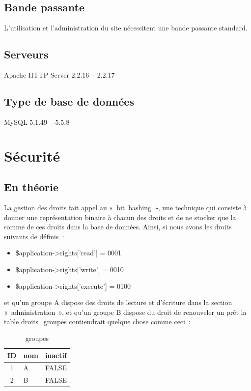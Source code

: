 \documentclass[letter, 11pt]{report}
\begin{document}
\subsection{Bande passante}
L'utilisation et l'administration du site nécessitent une bande passante standard.

\subsection{Serveurs}
Apache HTTP Server 2.2.16 -- 2.2.17

\subsection{Type de base de données}
MySQL 5.1.49 -- 5.5.8

\section{Sécurité}
\label{sec:sécurité}

\subsection{En théorie}

La gestion des droits fait appel au «~bit~bashing~», une technique qui consiste à donner une représentation binaire à chacun des droits et de ne stocker que la somme de ces droits dans la base de données. Ainsi, si nous avons les droits suivants de définis~:

\begin{itemize}
	\item \$application->rights['read'] = 0001
	\item \$application->rights['write'] = 0010
	\item \$application->rights['execute'] = 0100
\end{itemize}

et qu'un groupe A dispose des droits de lecture et d'écriture dans la section «~administration~», et qu'un groupe B dispose du droit de renouveler un prêt la table droits\_groupes contiendrait quelque chose comme ceci~:

\begin{table}[ht]
	\caption{groupes}
	\begin{center}
		\begin{tabular}{|c|l|l|}
			\hline
			ID & nom & inactif \\
			\hline
			1  & A   & FALSE \\
			2  & B   & FALSE \\
			\hline
		\end{tabular}
	\end{center}
\end{table}
\end{document}
